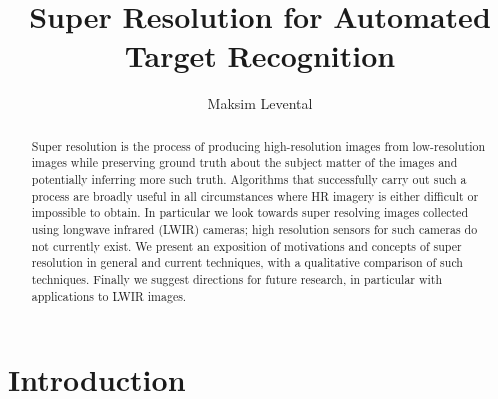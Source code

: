 \documentclass[journal]{IEEEtran}
\begin{document}
    \title{Super Resolution for Automated Target Recognition}
    \author{Maksim Levental}
    \maketitle

    \begin{abstract}
        Super resolution is the process of producing high-resolution images from low-resolution
        images while preserving ground truth about the subject matter of the images and potentially
        inferring more such truth. Algorithms that successfully carry out
        such a process are broadly useful in all circumstances where HR imagery is either difficult or impossible
        to obtain. In particular we look towards super resolving images collected using longwave infrared (LWIR)
        cameras; high resolution sensors for such cameras do not currently exist. We present an exposition of
        motivations and concepts of super resolution in general and current techniques, with a qualitative comparison of
        such techniques. Finally we suggest directions for future research, in particular with applications to LWIR images.
    \end{abstract}

    \section{Introduction}\label{sec:introduction}
\end{document}
